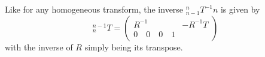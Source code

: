 Like for any homogeneous transform, the inverse $_{n-1}^nT^{-1}n$ is given by
\begin{equation}
^{n-1}_nT=\left(
\begin{array}{c|c}
R^{-1} & -R^{-1}T\\
\hline
0 \quad 0 \quad 0 \quad 1
\end{array}
\right)
\end{equation}
with the inverse of $R$ simply being its transpose.
